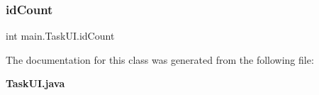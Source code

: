 \mbox{\label{classmain_1_1_task_u_i_ac561a3128768f58d8c9ddeadc2edddf3}} 
\subsubsection{id\+Count}
{\footnotesize\ttfamily int main.\+Task\+U\+I.\+id\+Count\hspace{0.3cm}{\ttfamily [private]}}



The documentation for this class was generated from the following file\+:\begin{DoxyCompactItemize}
\item 
\textbf{ Task\+U\+I.\+java}\end{DoxyCompactItemize}
